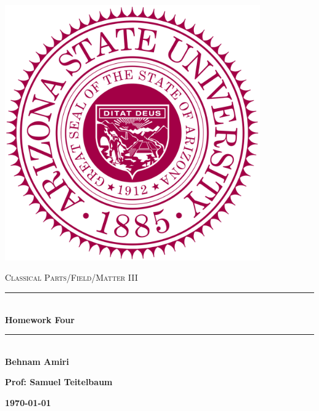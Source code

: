 \documentclass[fleqn]{article}
\begin{document}
  \begin{titlepage}

    \newcommand{\HRule}{\rule{\linewidth}{0.5mm}}

    \center

    \begin{center}
      \includegraphics[height=11cm, width=11cm]{asu.png}
    \end{center}

    \vline

    \textsc{\LARGE Classical Parts/Field/Matter III}\\[1.5cm]

    \HRule \\[0.5cm]
    { \huge \bfseries Homework Four}\\[0.4cm] 
    \HRule \\[1.0cm]

    \textbf{Behnam Amiri}

    \bigbreak

    \textbf{Prof: Samuel Teitelbaum}

    \bigbreak

    \textbf{{\large \today}\\[2cm]}

    \vfill

  \end{titlepage}
\end{document}
